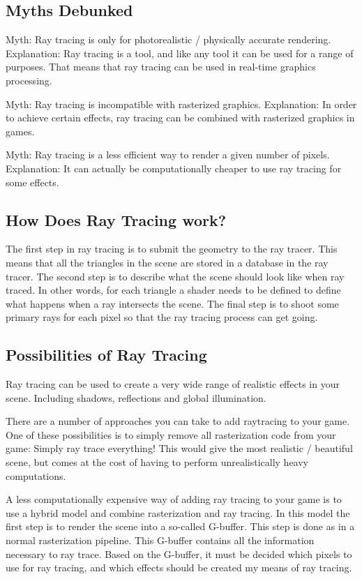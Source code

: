 \documentclass[a4paper]{article}
\begin{document}
\subsection{Myths Debunked}
Myth: Ray tracing is only for photorealistic / physically accurate rendering.
Explanation: Ray tracing is a tool, and like any tool it can be used for a range of purposes. That means that ray tracing can be used in real-time graphics processing.

Myth: Ray tracing is incompatible with rasterized graphics. 
Explanation: In order to achieve certain effects, ray tracing can be combined with rasterized graphics in games.

Myth: Ray tracing is a less efficient way to render a given number of pixels.
Explanation: It can actually be computationally cheaper to use ray tracing for some effects. 

\subsection{How Does Ray Tracing work?}
The first step in ray tracing is to submit the geometry to the ray tracer. This means that all the triangles in the scene are stored in a database in the ray tracer. The second step is to describe what the scene should look like when ray traced. In other words, for each triangle a shader needs to be defined to define what happens when a ray intersects the scene. The final step is to shoot some primary rays for each pixel so that the ray tracing process can get going. 

\subsection{Possibilities of Ray Tracing}
Ray tracing can be used to create a very wide range of realistic effects in your scene. Including shadows, reflections and global illumination. 

There are a number of approaches you can take to add raytracing to your game. One of these possibilities is to simply remove all rasterization code from your game: Simply ray trace everything! This would give the most realistic / beautiful scene, but comes at the cost of having to perform unrealistically heavy computations. 

A less computationally expensive way of adding ray tracing to your game is to use a hybrid model and combine rasterization and ray tracing. In this model the first step is to render the scene into a so-called G-buffer. This step is done as in a normal rasterization pipeline. This G-buffer contains all the information necessary to ray trace. Based on the G-buffer, it must be decided which pixels to use for ray tracing, and which effects should be created my means of ray tracing. 
\end{document}
